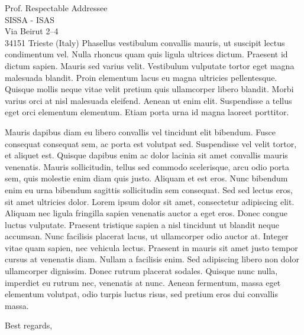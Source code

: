 \documentclass[10pt,english,a4paper]{letteracdp}
\begin{document}
\begin{foldedletter}{
    Prof. Respectable Addressee\\
    SISSA - ISAS\\
    Via Beirut 2--4\\
    34151 Trieste (Italy)
  }
Phasellus vestibulum convallis mauris, ut suscipit lectus condimentum vel. Nulla rhoncus quam quis ligula ultrices dictum. Praesent id dictum sapien. Mauris sed varius velit. Vestibulum vulputate tortor eget magna malesuada blandit. Proin elementum lacus eu magna ultricies pellentesque. Quisque mollis neque vitae velit pretium quis ullamcorper libero blandit. Morbi varius orci at nisl malesuada eleifend. Aenean ut enim elit. Suspendisse a tellus eget orci elementum elementum. Etiam porta urna id magna laoreet porttitor.

Mauris dapibus diam eu libero convallis vel tincidunt elit bibendum. Fusce consequat consequat sem, ac porta est volutpat sed. Suspendisse vel velit tortor, et aliquet est. Quisque dapibus enim ac dolor lacinia sit amet convallis mauris venenatis. Mauris sollicitudin, tellus sed commodo scelerisque, arcu odio porta sem, quis molestie enim diam quis justo. Aliquam et est eros. Nunc bibendum enim eu urna bibendum sagittis sollicitudin sem consequat. Sed sed lectus eros, sit amet ultricies dolor. Lorem ipsum dolor sit amet, consectetur adipiscing elit. Aliquam nec ligula fringilla sapien venenatis auctor a eget eros. Donec congue luctus vulputate. Praesent tristique sapien a nisl tincidunt ut blandit neque accumsan. Nunc facilisis placerat lacus, ut ullamcorper odio auctor at. Integer vitae quam sapien, nec vehicula lectus. Praesent in mauris sit amet justo tempor cursus at venenatis diam. Nullam a facilisis enim. Sed adipiscing libero non dolor ullamcorper dignissim. Donec rutrum placerat sodales. Quisque nunc nulla, imperdiet eu rutrum nec, venenatis at nunc. Aenean fermentum, massa eget elementum volutpat, odio turpis luctus risus, sed pretium eros dui convallis massa. 
  
  \closing{Best regards,}
  
\end{foldedletter}
\end{document}

